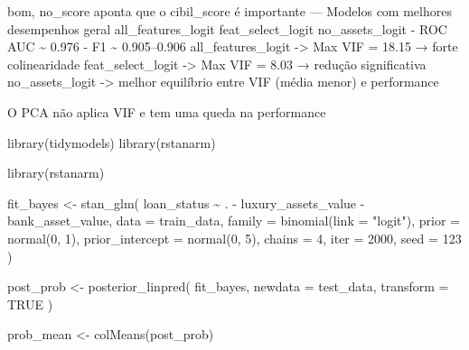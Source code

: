 \documentclass[
  letterpaper,
  DIV=11,
  numbers=noendperiod]{scrartcl}
\newenvironment{Shaded}{\begin{snugshade}}{\end{snugshade}}
\newcommand{\AttributeTok}[1]{\textcolor[rgb]{0.40,0.45,0.13}{#1}}
\newcommand{\ConstantTok}[1]{\textcolor[rgb]{0.56,0.35,0.01}{#1}}
\newcommand{\DecValTok}[1]{\textcolor[rgb]{0.68,0.00,0.00}{#1}}
\newcommand{\FunctionTok}[1]{\textcolor[rgb]{0.28,0.35,0.67}{#1}}
\newcommand{\NormalTok}[1]{\textcolor[rgb]{0.00,0.23,0.31}{#1}}
\newcommand{\OtherTok}[1]{\textcolor[rgb]{0.00,0.23,0.31}{#1}}
\newcommand{\SpecialCharTok}[1]{\textcolor[rgb]{0.37,0.37,0.37}{#1}}
\newcommand{\StringTok}[1]{\textcolor[rgb]{0.13,0.47,0.30}{#1}}
\begin{document}
bom, no\_score aponta que o cibil\_score é importante --- Modelos com
melhores desempenhos geral all\_features\_logit feat\_select\_logit
no\_assets\_logit - ROC AUC \textasciitilde{} 0.976 - F1
\textasciitilde{} 0.905--0.906 all\_features\_logit -\textgreater{} Max
VIF = 18.15 → forte colinearidade feat\_select\_logit -\textgreater{}
Max VIF = 8.03 → redução significativa no\_assets\_logit -\textgreater{}
melhor equilíbrio entre VIF (média menor) e performance

O PCA não aplica VIF e tem uma queda na performance

\begin{Shaded}
\begin{Highlighting}[]
\FunctionTok{library}\NormalTok{(tidymodels)}
\FunctionTok{library}\NormalTok{(rstanarm)}
\end{Highlighting}
\end{Shaded}

\begin{Shaded}
\begin{Highlighting}[]
\FunctionTok{library}\NormalTok{(rstanarm)}

\NormalTok{fit\_bayes }\OtherTok{\textless{}{-}} \FunctionTok{stan\_glm}\NormalTok{(}
\NormalTok{  loan\_status }\SpecialCharTok{\textasciitilde{}}\NormalTok{ . }\SpecialCharTok{{-}}\NormalTok{ luxury\_assets\_value }\SpecialCharTok{{-}}\NormalTok{ bank\_asset\_value,}
  \AttributeTok{data =}\NormalTok{ train\_data,}
  \AttributeTok{family =} \FunctionTok{binomial}\NormalTok{(}\AttributeTok{link =} \StringTok{"logit"}\NormalTok{),}
  \AttributeTok{prior =} \FunctionTok{normal}\NormalTok{(}\DecValTok{0}\NormalTok{, }\DecValTok{1}\NormalTok{),}
  \AttributeTok{prior\_intercept =} \FunctionTok{normal}\NormalTok{(}\DecValTok{0}\NormalTok{, }\DecValTok{5}\NormalTok{),}
  \AttributeTok{chains =} \DecValTok{4}\NormalTok{,}
  \AttributeTok{iter =} \DecValTok{2000}\NormalTok{,}
  \AttributeTok{seed =} \DecValTok{123}
\NormalTok{)}
\end{Highlighting}
\end{Shaded}

\begin{Shaded}
\begin{Highlighting}[]
\NormalTok{post\_prob }\OtherTok{\textless{}{-}} \FunctionTok{posterior\_linpred}\NormalTok{(}
\NormalTok{  fit\_bayes,}
  \AttributeTok{newdata =}\NormalTok{ test\_data,}
  \AttributeTok{transform =} \ConstantTok{TRUE}
\NormalTok{)}

\NormalTok{prob\_mean }\OtherTok{\textless{}{-}} \FunctionTok{colMeans}\NormalTok{(post\_prob)}
\end{Highlighting}
\end{Shaded}
\end{document}
